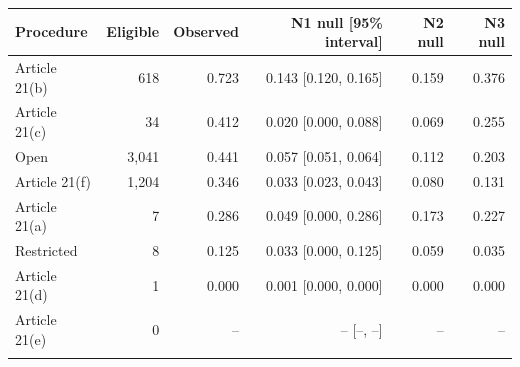 \begin{tabular}{@{}lrrrrr@{}}
\toprule
Procedure & Eligible & Observed & N1 null [95\% interval] & N2 null & N3 null\\
\midrule
Article 21(b) & 618 & 0.723 & 0.143 [0.120, 0.165] & 0.159 & 0.376\\
Article 21(c) & 34 & 0.412 & 0.020 [0.000, 0.088] & 0.069 & 0.255\\
Open & 3,041 & 0.441 & 0.057 [0.051, 0.064] & 0.112 & 0.203\\
Article 21(f) & 1,204 & 0.346 & 0.033 [0.023, 0.043] & 0.080 & 0.131\\
Article 21(a) & 7 & 0.286 & 0.049 [0.000, 0.286] & 0.173 & 0.227\\
Restricted & 8 & 0.125 & 0.033 [0.000, 0.125] & 0.059 & 0.035\\
Article 21(d) & 1 & 0.000 & 0.001 [0.000, 0.000] & 0.000 & 0.000\\
Article 21(e) & 0 & -- & -- [--, --] & -- & --\\
\botrule
\end{tabular}